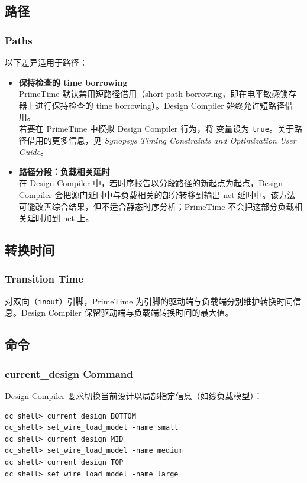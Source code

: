 \subsection{路径}
\subsubsection*{Paths}

以下差异适用于路径：
\begin{itemize}
  \item \textbf{保持检查的 time borrowing}\\
        PrimeTime 默认禁用短路径借用（short-path borrowing，即在电平敏感锁存器上进行保持检查的 time borrowing）。Design Compiler 始终允许短路径借用。\\
        若要在 PrimeTime 中模拟 Design Compiler 行为，将  变量设为 \texttt{true}。关于路径借用的更多信息，见 \textit{Synopsys Timing Constraints and Optimization User Guide}。
  \item \textbf{路径分段：负载相关延时}\\
        在 Design Compiler 中，若时序报告以分段路径的新起点为起点，Design Compiler 会把源门延时中与负载相关的部分转移到输出 net 延时中。该方法可能改善综合结果，但不适合静态时序分析；PrimeTime 不会把这部分负载相关延时加到 net 上。
\end{itemize}

\subsection{转换时间}
\subsubsection*{Transition Time}

对双向（\texttt{inout}）引脚，PrimeTime 为引脚的驱动端与负载端分别维护转换时间信息。Design Compiler 保留驱动端与负载端转换时间的最大值。

\subsection{ 命令}
\subsubsection*{current\_design Command}

Design Compiler 要求切换当前设计以局部指定信息（如线负载模型）：
\begin{lstlisting}
dc_shell> current_design BOTTOM
dc_shell> set_wire_load_model -name small
dc_shell> current_design MID
dc_shell> set_wire_load_model -name medium
dc_shell> current_design TOP
dc_shell> set_wire_load_model -name large
\end{lstlisting}

